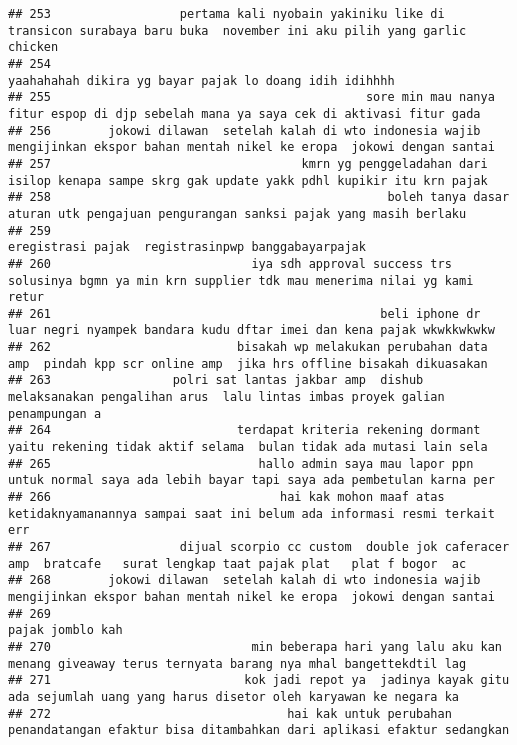 \documentclass[
]{article}
\begin{document}
\begin{verbatim}
## 253                  pertama kali nyobain yakiniku like di transicon surabaya baru buka  november ini aku pilih yang garlic chicken 
## 254                                                                           yaahahahah dikira yg bayar pajak lo doang idih idihhhh
## 255                                            sore min mau nanya fitur espop di djp sebelah mana ya saya cek di aktivasi fitur gada
## 256        jokowi dilawan  setelah kalah di wto indonesia wajib mengijinkan ekspor bahan mentah nikel ke eropa  jokowi dengan santai
## 257                                   kmrn yg penggeladahan dari isilop kenapa sampe skrg gak update yakk pdhl kupikir itu krn pajak
## 258                                               boleh tanya dasar aturan utk pengajuan pengurangan sanksi pajak yang masih berlaku
## 259                                                                               eregistrasi pajak  registrasinpwp banggabayarpajak
## 260                            iya sdh approval success trs solusinya bgmn ya min krn supplier tdk mau menerima nilai yg kami retur 
## 261                                              beli iphone dr luar negri nyampek bandara kudu dftar imei dan kena pajak wkwkkwkwkw
## 262                          bisakah wp melakukan perubahan data amp  pindah kpp scr online amp  jika hrs offline bisakah dikuasakan
## 263                 polri sat lantas jakbar amp  dishub melaksanakan pengalihan arus  lalu lintas imbas proyek galian penampungan a 
## 264                          terdapat kriteria rekening dormant yaitu rekening tidak aktif selama  bulan tidak ada mutasi lain sela 
## 265                             hallo admin saya mau lapor ppn untuk normal saya ada lebih bayar tapi saya ada pembetulan karna per 
## 266                                hai kak mohon maaf atas ketidaknyamanannya sampai saat ini belum ada informasi resmi terkait err 
## 267                  dijual scorpio cc custom  double jok caferacer amp  bratcafe   surat lengkap taat pajak plat   plat f bogor  ac
## 268        jokowi dilawan  setelah kalah di wto indonesia wajib mengijinkan ekspor bahan mentah nikel ke eropa  jokowi dengan santai
## 269                                                                                                                 pajak jomblo kah
## 270                            min beberapa hari yang lalu aku kan menang giveaway terus ternyata barang nya mhal bangettekdtil lag 
## 271                           kok jadi repot ya  jadinya kayak gitu ada sejumlah uang yang harus disetor oleh karyawan ke negara ka 
## 272                                 hai kak untuk perubahan penandatangan efaktur bisa ditambahkan dari aplikasi efaktur sedangkan  

\end{verbatim}
\end{document}
